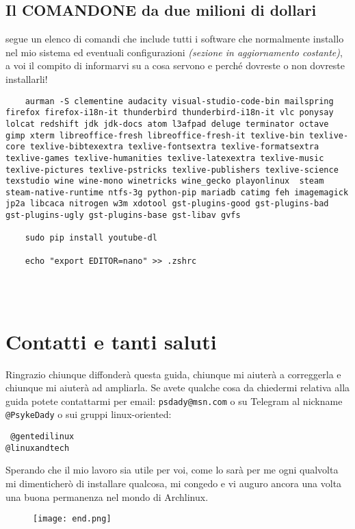 \documentclass[twoside,italian]{book}
\newcommand{\code}[1]{\texttt{#1}}
\newcommand{\centcode}[1]{

\definecolor{codice}{rgb}{0.5,0.1,0.1}

	\begin{center}
		\color{codice}
		\code{#1}
	\end{center}


}
\begin{document}
		\section{Il COMANDONE da due milioni di dollari}
			segue un elenco di comandi che include tutti i software che normalmente installo nel mio sistema ed eventuali configurazioni \textit{(sezione in aggiornamento costante)}, a voi il compito di informarvi su a cosa servono e perché dovreste o non dovreste installarli!
\begin{lstlisting}
	aurman -S clementine audacity visual-studio-code-bin mailspring firefox firefox-i18n-it thunderbird thunderbird-i18n-it vlc ponysay lolcat redshift jdk jdk-docs atom l3afpad deluge terminator octave gimp xterm libreoffice-fresh libreoffice-fresh-it texlive-bin texlive-core texlive-bibtexextra texlive-fontsextra texlive-formatsextra texlive-games texlive-humanities texlive-latexextra texlive-music texlive-pictures texlive-pstricks texlive-publishers texlive-science texstudio wine wine-mono winetricks wine_gecko playonlinux  steam steam-native-runtime ntfs-3g python-pip mariadb catimg feh imagemagick jp2a libcaca nitrogen w3m xdotool gst-plugins-good gst-plugins-bad gst-plugins-ugly gst-plugins-base gst-libav gvfs 
	
	sudo pip install youtube-dl
	
	echo "export EDITOR=nano" >> .zshrc
	
	
	
\end{lstlisting}


	\chapter{Contatti e tanti saluti}
		Ringrazio chiunque diffonderà questa guida, chiunque mi aiuterà a correggerla e chiunque mi aiuterà ad ampliarla. 
		Se avete qualche cosa da chiedermi relativa alla guida potete contattarmi per email: \code{psdady@msn.com} o su Telegram al nickname \code{@PsykeDady} o sui gruppi linux-oriented: \centcode{
			@gentedilinux\\
			  @linuxandtech
		}		
		
		Sperando che il mio lavoro sia utile per voi, come lo sarà per me ogni qualvolta mi dimenticherò di installare qualcosa, mi congedo e vi auguro ancora una volta una  buona permanenza nel mondo di Archlinux.
		\newpage
		\begin{figure}[p]
			\centering
			\texttt{[image: end.png]}
		\end{figure}
					
			
\end{document}

